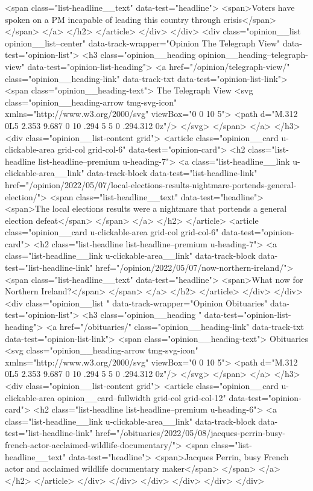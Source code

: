{{{<span class="list-headline__text" data-test="headline">
<span>Voters have spoken on a PM incapable of leading this country through crisis</span>
</span>
</a>
</h2>
</article>
</div>
</div>
<div class="opinion__list opinion__list--center" data-track-wrapper="Opinion The Telegraph View" data-test="opinion-list">
<h3 class="opinion__heading opinion__heading--telegraph-view" data-test="opinion-list-heading">
<a href="/opinion/telegraph-view/" class="opinion__heading-link" data-track-txt data-test="opinion-list-link">
<span class="opinion__heading-text">
The Telegraph View
<svg class="opinion__heading-arrow  tmg-svg-icon" xmlns="http://www.w3.org/2000/svg" viewBox="0 0 10 5">
<path d="M.312 0L5 2.353 9.687 0 10 .294 5 5 0 .294.312 0z"/>
</svg>
</span>
</a>
</h3>
<div class="opinion__list-content grid">
<article class="opinion__card u-clickable-area  grid-col grid-col-6" data-test="opinion-card">
<h2 class="list-headline list-headline--premium u-heading-7">
<a class="list-headline__link u-clickable-area__link" data-track-block data-test="list-headline-link" href="/opinion/2022/05/07/local-elections-results-nightmare-portends-general-election/">
<span class="list-headline__text" data-test="headline">
<span>The local elections results were a nightmare that portends a general election defeat</span>
</span>
</a>
</h2>
</article>
<article class="opinion__card u-clickable-area  grid-col grid-col-6" data-test="opinion-card">
<h2 class="list-headline list-headline--premium u-heading-7">
<a class="list-headline__link u-clickable-area__link" data-track-block data-test="list-headline-link" href="/opinion/2022/05/07/now-northern-ireland/">
<span class="list-headline__text" data-test="headline">
<span>What now for Northern Ireland?</span>
</span>
</a>
</h2>
</article>
</div>
</div>
<div class="opinion__list " data-track-wrapper="Opinion Obituaries" data-test="opinion-list">
<h3 class="opinion__heading " data-test="opinion-list-heading">
<a href="/obituaries/" class="opinion__heading-link" data-track-txt data-test="opinion-list-link">
<span class="opinion__heading-text">
Obituaries
<svg class="opinion__heading-arrow  tmg-svg-icon" xmlns="http://www.w3.org/2000/svg" viewBox="0 0 10 5">
<path d="M.312 0L5 2.353 9.687 0 10 .294 5 5 0 .294.312 0z"/>
</svg>
</span>
</a>
</h3>
<div class="opinion__list-content grid">
<article class="opinion__card u-clickable-area opinion__card--fullwidth grid-col grid-col-12" data-test="opinion-card">
<h2 class="list-headline list-headline--premium u-heading-6">
<a class="list-headline__link u-clickable-area__link" data-track-block data-test="list-headline-link" href="/obituaries/2022/05/08/jacques-perrin-busy-french-actor-acclaimed-wildlife-documentary/">
<span class="list-headline__text" data-test="headline">
<span>Jacques Perrin, busy French actor and acclaimed wildlife documentary maker</span>
</span>
</a>
</h2>
</article>
</div>
</div>
</div>
</div>
</div>
</div>

}}}
